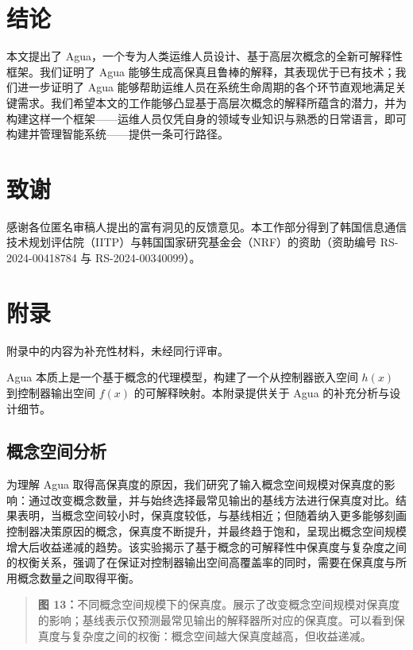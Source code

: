 \documentclass[11pt,a4paper]{article}
\begin{document}
\section{结论}

本文提出了 Agua，一个专为人类运维人员设计、基于高层次概念的全新可解释性框架。我们证明了 Agua 能够生成高保真且鲁棒的解释，其表现优于已有技术；我们进一步证明了 Agua 能够帮助运维人员在系统生命周期的各个环节直观地满足关键需求。我们希望本文的工作能够凸显基于高层次概念的解释所蕴含的潜力，并为构建这样一个框架——运维人员仅凭自身的领域专业知识与熟悉的日常语言，即可构建并管理智能系统——提供一条可行路径。

\section*{致谢}

感谢各位匿名审稿人提出的富有洞见的反馈意见。本工作部分得到了韩国信息通信技术规划评估院（IITP）与韩国国家研究基金会（NRF）的资助（资助编号 RS-2024-00418784 与 RS-2024-00340099）。

\appendix
\section{附录}

附录中的内容为补充性材料，未经同行评审。

Agua 本质上是一个基于概念的代理模型，构建了一个从控制器嵌入空间 $h(x)$ 到控制器输出空间 $f(x)$ 的可解释映射。本附录提供关于 Agua 的补充分析与设计细节。

\subsection{概念空间分析}

为理解 Agua 取得高保真度的原因，我们研究了输入概念空间规模对保真度的影响：通过改变概念数量，并与始终选择最常见输出的基线方法进行保真度对比。结果表明，当概念空间较小时，保真度较低，与基线相近；但随着纳入更多能够刻画控制器决策原因的概念，保真度不断提升，并最终趋于饱和，呈现出概念空间规模增大后收益递减的趋势。该实验揭示了基于概念的可解释性中保真度与复杂度之间的权衡关系，强调了在保证对控制器输出空间高覆盖率的同时，需要在保真度与所用概念数量之间取得平衡。

\begin{quote}\small\noindent\textbf{图 13：}不同概念空间规模下的保真度。展示了改变概念空间规模对保真度的影响；基线表示仅预测最常见输出的解释器所对应的保真度。可以看到保真度与复杂度之间的权衡：概念空间越大保真度越高，但收益递减。\end{quote}
\end{document}
